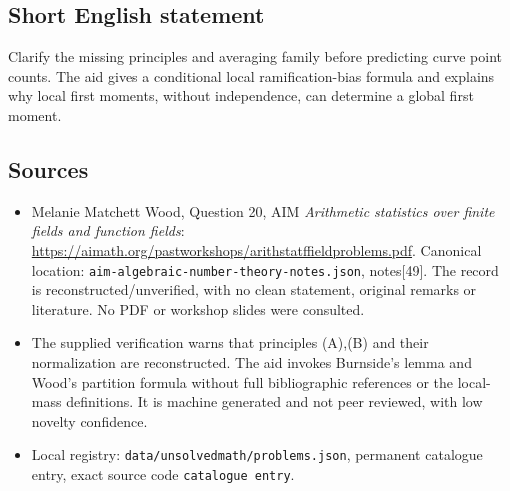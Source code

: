 \documentclass[11pt]{article}
\begin{document}
\subsection{Short English statement}
Clarify the missing principles and averaging family before predicting curve point counts. The aid gives a conditional local ramification-bias formula and explains why local first moments, without independence, can determine a global first moment.
\subsection{Sources}
\begin{itemize}
\item Melanie Matchett Wood, Question 20, AIM \emph{Arithmetic statistics over finite fields and function fields}: \url{https://aimath.org/pastworkshops/arithstatffieldproblems.pdf}. Canonical location: \texttt{aim-algebraic-number-theory-notes.json}, notes[49]. The record is reconstructed/unverified, with no clean statement, original remarks or literature. No PDF or workshop slides were consulted.
\item The supplied verification warns that principles (A),(B) and their normalization are reconstructed. The aid invokes Burnside's lemma and Wood's partition formula without full bibliographic references or the local-mass definitions. It is machine generated and not peer reviewed, with low novelty confidence.
\item Local registry: \texttt{data/unsolvedmath/problems.json}, permanent catalogue entry, exact source code \texttt{catalogue entry}.
\end{itemize}
\end{document}
